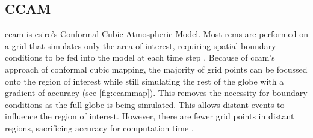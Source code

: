 
		\subsection{CCAM}
		\label{subsec:ccam}

		\gls{ccam} is \gls{csiro}'s Conformal-Cubic Atmospheric Model. Most \gls{rcm}s are performed on a grid that simulates only the area of interest, requiring spatial boundary conditions to be fed into the model at each time step \citep{hurley2002air}. Because of \gls{ccam}'s approach of conformal cubic mapping, the majority of grid points can be focussed onto the region of interest while still simulating the rest of the globe with a gradient of accuracy (see \cref{fig:ccammap}). This removes the necessity for boundary conditions as the full globe is being simulated. This allows distant events to influence the region of interest. However, there are fewer grid points in distant regions, sacrificing accuracy for computation time \citep{mcgregor:2005wz}.

